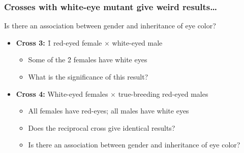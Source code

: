\begin{frame}
    \frametitle{Crosses with white-eye mutant give weird results\ldots}
    Is there an association between gender and inheritance of eye color?

    \begin{itemize}[<+->]
        \item \textbf{Cross 3:} \f{1} red-eyed female $\times$ white-eyed male
            \begin{itemize}
                \item Some of the \f{2} females have white eyes
                \item What is the significance of this result?
            \end{itemize}

            \vspace{1cm}
        \item \textbf{Cross 4:} White-eyed females $\times$ true-breeding
            red-eyed males
            \begin{itemize}
                \item All females have red-eyes; all males have white eyes
                \item Does the reciprocal cross give identical results?
                \item Is there an association between gender and inheritance of
                    eye color? 
            \end{itemize}
    \end{itemize}
\end{frame}

